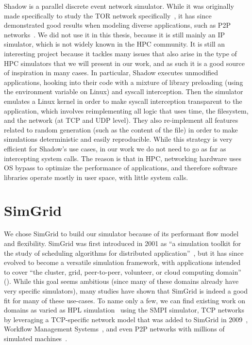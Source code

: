 Shadow is a parallel discrete event network simulator. While it was originally
made specifically to study the TOR network specifically~\cite{Jansen2012}, it
has since demonstrated good results when modeling diverse applications, such as
P2P networks~\cite{Jansen2022}. We did not use it in this thesis, because it is
still mainly an IP simulator, which is not widely known in the HPC community. It
is still an interesting project because it tackles many issues that also arise
in the type of HPC simulators that we will present in our work, and as such it
is a good source of inspiration in many cases. In particular, Shadow executes
unmodified applications, hooking into their code with a mixture of library
preloading (using the  environment variable on Linux) and
syscall interception. Then the simulator emulates a Linux kernel in order to
make syscall interception transparent to the application, which involves
reimplementing all logic that uses time, the filesystem, and the network (at TCP
and UDP level). They also re-implement all features related to random generation
(such as the content of the  file) in order to make
simulations deterministic and easily reproducible. While this strategy is very
efficient for Shadow's use cases, in our work we do not need to go as far as
intercepting system calls. The reason is that in HPC, networking hardware uses
OS bypass to optimize the performance of applications, and therefore software
libraries operate mostly in user space, with little system calls.

\section{SimGrid}
\label{sec:3_related_work_simu:simgrid}

We chose SimGrid to build our simulator because of its performant flow model and
flexibility. SimGrid was first introduced in 2001 as ``a simulation toolkit for
the study of scheduling algorithms for distributed
application''~\cite{Casanova2001a}, but it has since evolved to become a
versatile simulation framework, with applications intended to cover ``the
cluster, grid, peer-to-peer, volunteer, or cloud computing domain''
(\cite{Casanova2014a}). While this goal seems ambitious (since many of these
domains already have very specific simulators), many studies have shown that
SimGrid is indeed a good fit for many of these use-cases. To name only a few, we
can find existing work on domains as varied as HPL
simulation~\cite{Cornebize2017b,Cornebize2017a,Cornebize2021} using the SMPI
simulator, TCP networks~\cite{Bedaride2013a} by leveraging a TCP-specific
network model that was added to SimGrid in 2009~\cite{Velho2009a}, Workflow
Management Systems~\cite{Casanova2019}, and even P2P networks with millions of
simulated machines~\cite{Quinson2013}.

